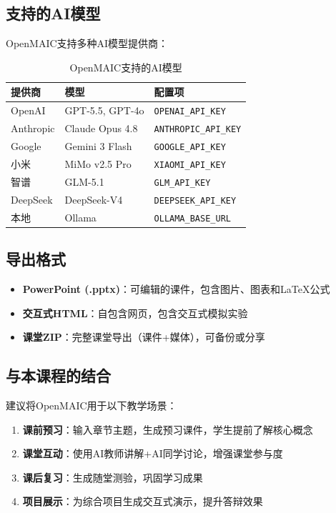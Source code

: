 \subsection{支持的AI模型}

OpenMAIC支持多种AI模型提供商：

\begin{table}[H]
\centering
\begin{tabular}{lll}
\toprule
\textbf{提供商} & \textbf{模型} & \textbf{配置项} \\
\midrule
OpenAI & GPT-5.5, GPT-4o & \texttt{OPENAI\_API\_KEY} \\
Anthropic & Claude Opus 4.8 & \texttt{ANTHROPIC\_API\_KEY} \\
Google & Gemini 3 Flash & \texttt{GOOGLE\_API\_KEY} \\
小米 & MiMo v2.5 Pro & \texttt{XIAOMI\_API\_KEY} \\
智谱 & GLM-5.1 & \texttt{GLM\_API\_KEY} \\
DeepSeek & DeepSeek-V4 & \texttt{DEEPSEEK\_API\_KEY} \\
本地 & Ollama & \texttt{OLLAMA\_BASE\_URL} \\
\bottomrule
\end{tabular}
\caption{OpenMAIC支持的AI模型}
\end{table}

\subsection{导出格式}

\begin{itemize}[leftmargin=1.5em]
  \item \textbf{PowerPoint (.pptx)}：可编辑的课件，包含图片、图表和LaTeX公式
  \item \textbf{交互式HTML}：自包含网页，包含交互式模拟实验
  \item \textbf{课堂ZIP}：完整课堂导出（课件+媒体），可备份或分享
\end{itemize}

\subsection{与本课程的结合}

建议将OpenMAIC用于以下教学场景：

\begin{enumerate}[leftmargin=1.5em]
  \item \textbf{课前预习}：输入章节主题，生成预习课件，学生提前了解核心概念
  \item \textbf{课堂互动}：使用AI教师讲解+AI同学讨论，增强课堂参与度
  \item \textbf{课后复习}：生成随堂测验，巩固学习成果
  \item \textbf{项目展示}：为综合项目生成交互式演示，提升答辩效果
\end{enumerate}

